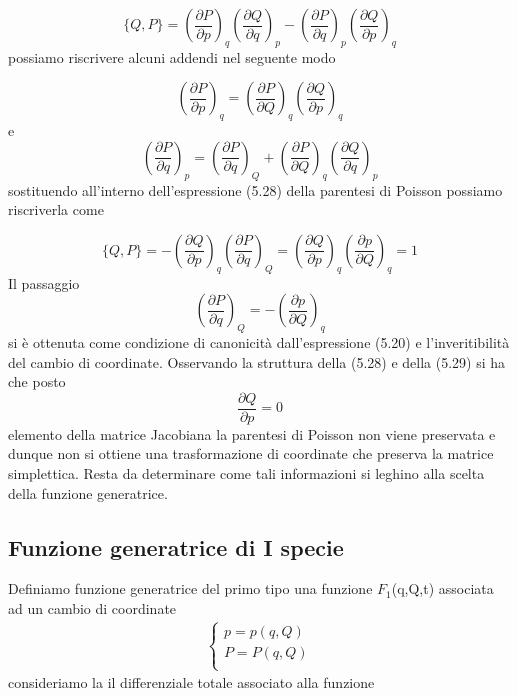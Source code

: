 \begin{equation}
	\{Q,P\} = \left(\frac{\partial P}{\partial p}\right)_q\left(\frac{\partial Q}{\partial q}\right)_p-\left(\frac{\partial P}{\partial q}\right)_p\left(\frac{\partial Q}{\partial p}\right)_q
\end{equation}
possiamo riscrivere alcuni addendi nel seguente modo

\begin{equation}
	\left(\frac{\partial P}{\partial p}\right)_q=\left(\frac{\partial P}{\partial Q}\right)_q\left(\frac{\partial Q}{\partial p}\right)_q
\end{equation}
e
\begin{equation*}
	\left(\frac{\partial P}{\partial q}\right)_p=\left(\frac{\partial P}{\partial q}\right)_Q+\left(\frac{\partial P}{\partial Q}\right)_q\left(\frac{\partial Q}{\partial q}\right)_p
\end{equation*}
sostituendo all'interno dell'espressione (5.28) della parentesi di Poisson possiamo riscriverla come

\begin{equation}
	\{Q,P\} = -\left(\frac{\partial Q}{\partial p}\right)_q\left(\frac{\partial P}{\partial q}\right)_Q = \left(\frac{\partial Q}{\partial p}\right)_q\left(\frac{\partial p}{\partial Q}\right)_q = 1
\end{equation}
Il passaggio 
\begin{equation*}
	\left(\frac{\partial P}{\partial q}\right)_Q = -\left (\frac{\partial p}{\partial Q}\right)_q
\end{equation*}
si \`{e} ottenuta come condizione di canonicit\`{a} dall'espressione (5.20) e l'inveritibilit\`{a} del cambio di coordinate.
\newline
Osservando la struttura della (5.28) e della (5.29) si ha che posto 
\begin{equation}
	\frac{\partial Q}{\partial p} = 0
\end{equation} 
elemento della matrice Jacobiana la parentesi di Poisson non viene preservata e dunque non si ottiene una trasformazione di coordinate che preserva la matrice simplettica.
Resta da determinare come tali informazioni si leghino alla scelta della funzione generatrice.

\subsection{Funzione generatrice di I specie}

Definiamo funzione generatrice del primo tipo una funzione $F_1$(q,Q,t) associata ad un cambio di coordinate
\begin{align*}
	\begin{cases}
		p = p(q,Q)\\
		P = P(q,Q)\\
	\end{cases}
\end{align*}
consideriamo la il differenziale totale associato alla funzione 

